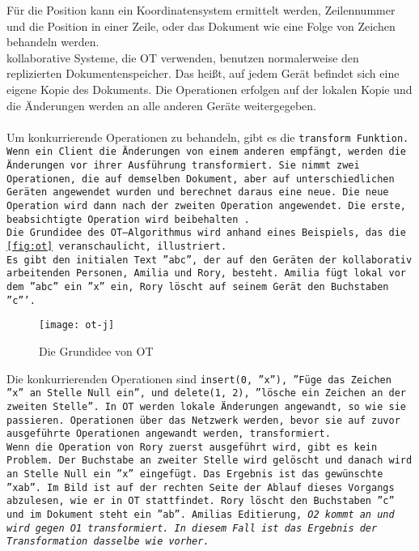 Für die Position kann ein Koordinatensystem ermittelt werden, Zeilennummer und die Position in einer Zeile, oder das Dokument wie eine Folge von Zeichen behandeln werden.\\
%
\Gls{kollaborativ}e Systeme, die \gls{OT} verwenden, benutzen normalerweise den replizierten Dokumentenspeicher.
Das heißt, auf jedem Gerät befindet sich eine eigene Kopie des Dokuments.
Die Operationen erfolgen auf der lokalen Kopie und die Änderungen werden an alle anderen Geräte weitergegeben.\\\\
%
Um konkurrierende Operationen zu behandeln, gibt es die \tt{transform} Funktion.
Wenn ein Client die Änderungen von einem anderen empfängt, werden die Änderungen vor ihrer Ausführung transformiert.
Sie nimmt zwei Operationen, die auf demselben Dokument, aber auf unterschiedlichen Geräten angewendet wurden und berechnet daraus eine neue.
Die neue Operation wird dann nach der zweiten Operation angewendet. Die erste, beabsichtigte Operation wird beibehalten~\cite{ot_paper}.\\
%
Die Grundidee des \gls{OT}--Algorithmus wird anhand eines Beispiels, das die \autoref{fig:ot} veranschaulicht, illustriert.\\
Es gibt den initialen Text ''abc'', der auf den Geräten der kollaborativ arbeitenden Personen, Amilia und Rory, besteht.
Amilia fügt lokal vor dem ''abc'' ein ''x'' ein, Rory löscht auf seinem Gerät den Buchstaben ''c'''.
%
\begin{figure}[h]
  \centering
  \texttt{[image: ot-j]}
  \grayRule
  \caption{Die Grundidee von \gls{OT}}
  \label{fig:ot}
\end{figure}
%
Die konkurrierenden Operationen sind \tt{insert(0, ''x'')}, ''Füge das Zeichen ''x'' an Stelle Null ein'', und \tt{delete(1, 2)}, ''lösche ein Zeichen an der zweiten Stelle''.
In \gls{OT} werden lokale Änderungen angewandt, so wie sie passieren.
Operationen über das Netzwerk werden, bevor sie auf zuvor ausgeführte Operationen angewandt werden, transformiert.\\
%
Wenn die Operation von Rory zuerst ausgeführt wird, gibt es kein Problem. Der Buchstabe an zweiter Stelle wird gelöscht und danach wird an Stelle Null ein ''x'' eingefügt. Das Ergebnis ist das gewünschte ''xab''.
Im Bild ist auf der rechten Seite der Ablauf dieses Vorgangs abzulesen, wie er in \gls{OT} stattfindet.
Rory löscht den Buchstaben ''c'' und im Dokument steht ein ''ab''.
Amilias Editierung, \it{O2} kommt an und wird gegen \it{O1} transformiert. In diesem Fall ist das Ergebnis der Transformation dasselbe wie vorher.
